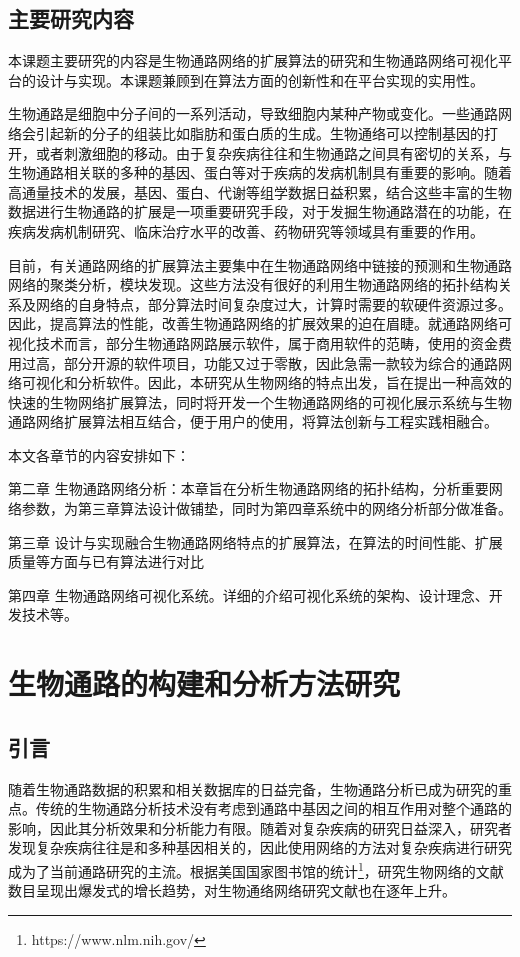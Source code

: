 \section{主要研究内容}
本课题主要研究的内容是生物通路网络的扩展算法的研究和生物通路网络可视化平台的设计与实现。本课题兼顾到在算法方面的创新性和在平台实现的实用性。

生物通路是细胞中分子间的一系列活动，导致细胞内某种产物或变化。一些通路网络会引起新的分子的组装比如脂肪和蛋白质的生成。生物通络可以控制基因的打开，或者刺激细胞的移动。由于复杂疾病往往和生物通路之间具有密切的关系，与生物通路相关联的多种的基因、蛋白等对于疾病的发病机制具有重要的影响。随着高通量技术的发展，基因、蛋白、代谢等组学数据日益积累，结合这些丰富的生物数据进行生物通路的扩展是一项重要研究手段，对于发掘生物通路潜在的功能，在疾病发病机制研究、临床治疗水平的改善、药物研究等领域具有重要的作用。

目前，有关通路网络的扩展算法主要集中在生物通路网络中链接的预测和生物通路网络的聚类分析，模块发现。这些方法没有很好的利用生物通路网络的拓扑结构关系及网络的自身特点，部分算法时间复杂度过大，计算时需要的软硬件资源过多。因此，提高算法的性能，改善生物通路网络的扩展效果的迫在眉睫。就通路网络可视化技术而言，部分生物通路网路展示软件，属于商用软件的范畴，使用的资金费用过高，部分开源的软件项目，功能又过于零散，因此急需一款较为综合的通路网络可视化和分析软件。因此，本研究从生物网络的特点出发，旨在提出一种高效的快速的生物网络扩展算法，同时将开发一个生物通路网络的可视化展示系统与生物通路网络扩展算法相互结合，便于用户的使用，将算法创新与工程实践相融合。

本文各章节的内容安排如下：

第二章 生物通路网络分析：本章旨在分析生物通路网络的拓扑结构，分析重要网络参数，为第三章算法设计做铺垫，同时为第四章系统中的网络分析部分做准备。

第三章 设计与实现融合生物通路网络特点的扩展算法，在算法的时间性能、扩展质量等方面与已有算法进行对比

第四章 生物通路网络可视化系统。详细的介绍可视化系统的架构、设计理念、开发技术等。


\chapter{生物通路的构建和分析方法研究}
\section{引言}
随着生物通路数据的积累和相关数据库的日益完备，生物通路分析已成为研究的重点。传统的生物通路分析技术没有考虑到通路中基因之间的相互作用对整个通路的影响，因此其分析效果和分析能力有限。随着对复杂疾病的研究日益深入，研究者发现复杂疾病往往是和多种基因相关的，因此使用网络的方法对复杂疾病进行研究成为了当前通路研究的主流。根据美国国家图书馆的统计\footnote{https://www.nlm.nih.gov/}，研究生物网络的文献数目呈现出爆发式的增长趋势，对生物通络网络研究文献也在逐年上升。


